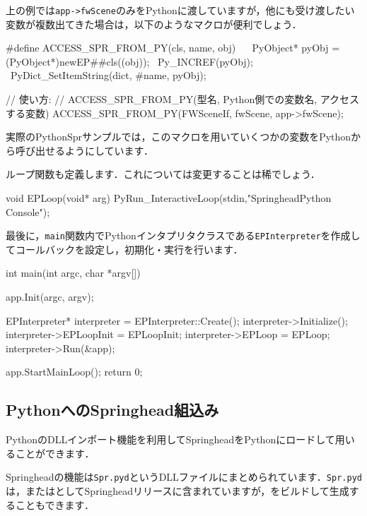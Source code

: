 \KLUDGE 上の例では\texttt{app->fwScene}のみをPythonに渡していますが，他にも受け渡したい変数が複数出てきた場合は，以下のようなマクロが便利でしょう．
\begin{sourcecode}
#define ACCESS_SPR_FROM_PY(cls, name, obj)           \
{                                                    \
    PyObject* pyObj = (PyObject*)newEP##cls((obj));  \
    Py_INCREF(pyObj);                                \
    PyDict_SetItemString(dict, #name, pyObj);        \
}                                                    \

// 使い方:
// ACCESS_SPR_FROM_PY(型名, Python側での変数名, アクセスする変数)
ACCESS_SPR_FROM_PY(FWSceneIf, fwScene, app->fwScene);
\end{sourcecode}
\KLUDGE 実際のPythonSprサンプルでは，このマクロを用いていくつかの変数をPythonから呼び出せるようにしています．

\KLUDGE ループ関数も定義します．これについては変更することは稀でしょう．
\begin{sourcecode}
void EPLoop(void* arg) {
	PyRun_InteractiveLoop(stdin,"SpringheadPython Console");
}
\end{sourcecode}

\KLUDGE 最後に，\texttt{main}関数内でPythonインタプリタクラスである\texttt{EPInterpreter}を作成してコールバックを設定し，初期化・実行を行います．
\begin{sourcecode}
int main(int argc, char *argv[]) {
  app.Init(argc, argv);

  EPInterpreter* interpreter = EPInterpreter::Create();
  interpreter->Initialize();
  interpreter->EPLoopInit = EPLoopInit;
  interpreter->EPLoop = EPLoop;
  interpreter->Run(&app);

  app.StartMainLoop();
  return 0;
}
\end{sourcecode}





\KLUDGE %
\KLUDGE %
\subsection*{PythonへのSpringhead組込み}

PythonのDLLインポート機能を利用してSpringheadをPythonにロードして用いることができます．

Springheadの機能は\texttt{Spr.pyd}というDLLファイルにまとめられています．\texttt{Spr.pyd}は，またはとしてSpringheadリリースに含まれていますが，をビルドして生成することもできます．

